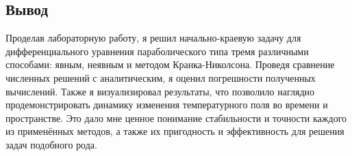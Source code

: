 \documentclass{article}
\begin{document}
\subsection*{Вывод}
Проделав лабораторную работу, я решил начально-краевую задачу для дифференциального уравнения параболического типа тремя различными способами: 
явным, неявным и методом Кранка-Николсона. Проведя сравнение численных решений с аналитическим, я оценил погрешности полученных вычислений. 
Также я визуализировал результаты, что позволило наглядно продемонстрировать динамику изменения температурного поля во времени и пространстве. 
Это дало мне ценное понимание стабильности и точности каждого из применённых методов, а также их пригодность и эффективность для решения задач подобного рода.
\end{document}
